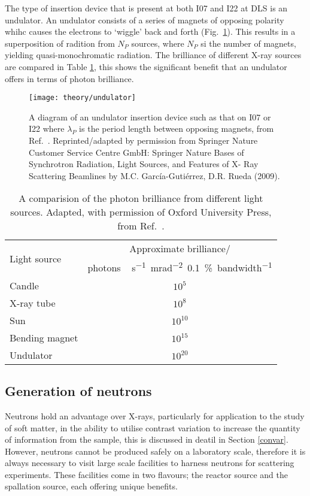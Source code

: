 The type of insertion device that is present at both I07 and I22 at DLS is an undulator. An undulator consists of a series of magnets of opposing polarity whihc causes the electrons to `wiggle' back and forth (Fig.~\ref{fig:undulator}). This results in a superposition of radition from $N_P$ sources, where $N_P$ si the number of magnets, yielding quasi-monochromatic radiation. The brilliance of different X-ray sources are compared in Table \ref{tab:sources}, this shows the significant benefit that an undulator offers in terms of photon brilliance.
%
\begin{figure}
	\centering
	\texttt{[image: theory/undulator]}
	\caption{A diagram of an undulator insertion device such as that on I07 or I22 where $\lambda_P$ is the period length between opposing magnets, from Ref.~\cite{Garcia-Gutierrez2009}. Reprinted/adapted by permission from Springer Nature Customer Service Centre GmbH: Springer Nature Bases of Synchrotron Radiation, Light Sources, and Features of X- Ray Scattering Beamlines by M.C. Garc\'{i}a-Guti\'{e}rrez, D.R. Rueda\textsuperscript{\textcopyright} (2009).}
	\label{fig:undulator}
\end{figure}
%
%
\begin{table}
	\centering
	\caption{A comparision of the photon brilliance from different light sources. Adapted, with permission of Oxford University Press\textsuperscript{\textcopyright}, from Ref.~\cite{Sivia2011}.}
	\label{tab:sources}
	\begin{tabular}{l | c}
		\toprule
		\multirow{2}{*}{Light source } & Approximate brilliance/ \\
 & \si{photons\,\second^{-1}\milli\radian^{-2}{0.1}\percent bandwidth^{-1}} \\
		\midrule
		Candle & $10^5$ \\
		X-ray tube & $10^8$ \\
		Sun & $10^{10}$ \\
		Bending magnet & $10^{15}$ \\
		Undulator & $10^{20}$ \\
		\bottomrule
	\end{tabular}
\end{table}

\subsection{Generation of neutrons}

Neutrons hold an advantage over X-rays, particularly for application to the study of soft matter, in the ability to utilise contrast variation to increase the quantity of information from the sample, this is discussed in deatil in Section \ref{convar}. However, neutrons cannot be produced safely on a laboratory scale, therefore it is always necessary to visit large scale facilities to harness neutrons for scattering experiments. These facilities come in two flavours; the reactor source and the spallation source, each offering unique benefits.


